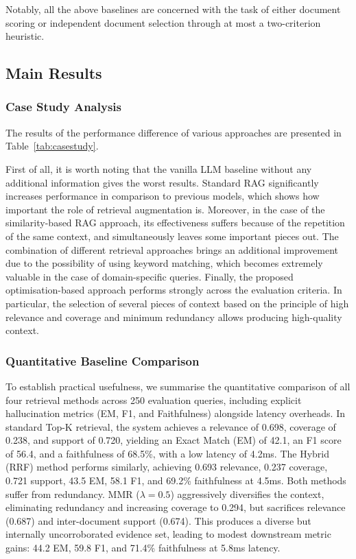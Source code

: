 \documentclass[conference]{IEEEtran}
\begin{document}
Notably, all the above baselines are concerned with the task of either document scoring or independent document selection through at most a two-criterion heuristic.

\subsection{Main Results}

\subsubsection{Case Study Analysis}

The results of the performance difference of various approaches are presented in Table~\ref{tab:casestudy}.


First of all, it is worth noting that the vanilla LLM baseline without any additional information gives the worst results. Standard RAG significantly increases performance in comparison to previous models, which shows how important the role of retrieval augmentation is. Moreover, in the case of the similarity-based RAG approach, its effectiveness suffers because of the repetition of the same context, and simultaneously leaves some important pieces out. The combination of different retrieval approaches brings an additional improvement due to the possibility of using keyword matching, which becomes extremely valuable in the case of domain-specific queries. Finally, the proposed optimisation-based approach performs strongly across the evaluation criteria. In particular, the selection of several pieces of context based on the principle of high relevance and coverage and minimum redundancy allows producing high-quality context.

\subsubsection{Quantitative Baseline Comparison}

To establish practical usefulness, we summarise the quantitative comparison of all four retrieval methods across 250 evaluation queries, including explicit hallucination metrics (EM, F1, and Faithfulness) alongside latency overheads. In standard Top-K retrieval, the system achieves a relevance of 0.698, coverage of 0.238, and support of 0.720, yielding an Exact Match (EM) of 42.1, an F1 score of 56.4, and a faithfulness of 68.5\%, with a low latency of 4.2ms. The Hybrid (RRF) method performs similarly, achieving 0.693 relevance, 0.237 coverage, 0.721 support, 43.5 EM, 58.1 F1, and 69.2\% faithfulness at 4.5ms. Both methods suffer from redundancy. MMR ($\lambda{=}0.5$) aggressively diversifies the context, eliminating redundancy and increasing coverage to 0.294, but sacrifices relevance (0.687) and inter-document support (0.674). This produces a diverse but internally uncorroborated evidence set, leading to modest downstream metric gains: 44.2 EM, 59.8 F1, and 71.4\% faithfulness at 5.8ms latency.
\end{document}
